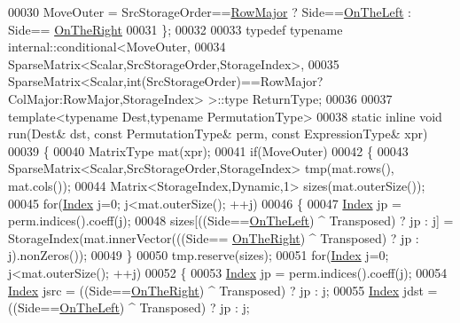\begin{DoxyCode}
00030       MoveOuter = SrcStorageOrder==\hyperlink{group__enums_ggaacded1a18ae58b0f554751f6cdf9eb13acfcde9cd8677c5f7caf6bd603666aae3}{RowMajor} ? Side==\hyperlink{group__enums_ggac22de43beeac7a78b384f99bed5cee0ba129609b3bdf23b071f5f86cf2f995ec4}{OnTheLeft} : Side==
      \hyperlink{group__enums_ggac22de43beeac7a78b384f99bed5cee0ba99dc75d8e00b6c3a5bdc31940f47492b}{OnTheRight}
00031     \};
00032     
00033     \textcolor{keyword}{typedef} \textcolor{keyword}{typename} internal::conditional<MoveOuter,
00034         SparseMatrix<Scalar,SrcStorageOrder,StorageIndex>,
00035         SparseMatrix<Scalar,int(SrcStorageOrder)==RowMajor?ColMajor:RowMajor,StorageIndex> >::type 
      ReturnType;
00036 
00037     \textcolor{keyword}{template}<\textcolor{keyword}{typename} Dest,\textcolor{keyword}{typename} PermutationType>
00038     \textcolor{keyword}{static} \textcolor{keyword}{inline} \textcolor{keywordtype}{void} run(Dest& dst, \textcolor{keyword}{const} PermutationType& perm, \textcolor{keyword}{const} ExpressionType& xpr)
00039     \{
00040       MatrixType mat(xpr);
00041       \textcolor{keywordflow}{if}(MoveOuter)
00042       \{
00043         SparseMatrix<Scalar,SrcStorageOrder,StorageIndex> tmp(mat.rows(), mat.cols());
00044         Matrix<StorageIndex,Dynamic,1> sizes(mat.outerSize());
00045         \textcolor{keywordflow}{for}(\hyperlink{namespace_eigen_a62e77e0933482dafde8fe197d9a2cfde}{Index} j=0; j<mat.outerSize(); ++j)
00046         \{
00047           \hyperlink{namespace_eigen_a62e77e0933482dafde8fe197d9a2cfde}{Index} jp = perm.indices().coeff(j);
00048           sizes[((Side==\hyperlink{group__enums_ggac22de43beeac7a78b384f99bed5cee0ba129609b3bdf23b071f5f86cf2f995ec4}{OnTheLeft}) ^ Transposed) ? jp : j] = StorageIndex(mat.innerVector(((Side==
      \hyperlink{group__enums_ggac22de43beeac7a78b384f99bed5cee0ba99dc75d8e00b6c3a5bdc31940f47492b}{OnTheRight}) ^ Transposed) ? jp : j).nonZeros());
00049         \}
00050         tmp.reserve(sizes);
00051         \textcolor{keywordflow}{for}(\hyperlink{namespace_eigen_a62e77e0933482dafde8fe197d9a2cfde}{Index} j=0; j<mat.outerSize(); ++j)
00052         \{
00053           \hyperlink{namespace_eigen_a62e77e0933482dafde8fe197d9a2cfde}{Index} jp = perm.indices().coeff(j);
00054           \hyperlink{namespace_eigen_a62e77e0933482dafde8fe197d9a2cfde}{Index} jsrc = ((Side==\hyperlink{group__enums_ggac22de43beeac7a78b384f99bed5cee0ba99dc75d8e00b6c3a5bdc31940f47492b}{OnTheRight}) ^ Transposed) ? jp : j;
00055           \hyperlink{namespace_eigen_a62e77e0933482dafde8fe197d9a2cfde}{Index} jdst = ((Side==\hyperlink{group__enums_ggac22de43beeac7a78b384f99bed5cee0ba129609b3bdf23b071f5f86cf2f995ec4}{OnTheLeft}) ^ Transposed) ? jp : j;

\end{DoxyCode}
